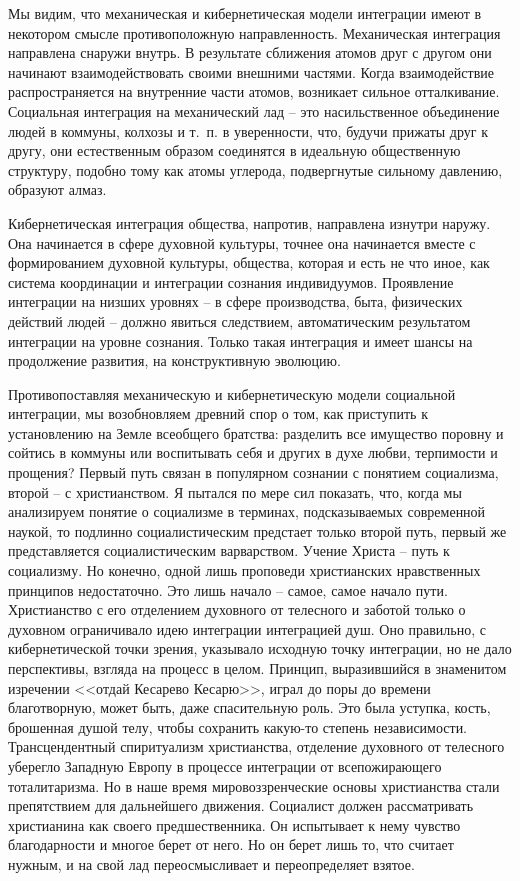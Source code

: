 \documentclass{book}
\begin{document}
Мы видим, что механическая и кибернетическая модели ин­теграции имеют в некотором смысле противоположную на­правленность. Механическая интеграция направлена снаружи внутрь. В результате сближения атомов друг с другом они на­чинают взаимодействовать своими внешними частями. Когда взаимодействие распространяется на внутренние части атомов, возникает сильное отталкивание. Социальная интеграция на механический лад -- это насильственное объединение людей в коммуны, колхозы и т.~п. в уверенности, что, будучи прижаты друг к другу, они естественным образом соединятся в идеаль­ную общественную структуру, подобно тому как атомы углерода, подвергнутые сильному давлению, образуют алмаз.

Кибернетическая интеграция общества, напротив, направ­лена изнутри наружу. Она начинается в сфере духовной куль­туры, точнее она начинается вместе с  формированием духов­ной культуры, общества, которая и есть не что иное, как си­стема координации и интеграции сознания индивидуумов. Про­явление интеграции на низших уровнях -- в сфере производст­ва, быта, физических действий людей -- должно явиться следст­вием, автоматическим результатом интеграции на уровне со­знания. Только такая интеграция и имеет шансы на продолже­ние развития, на конструктивную эволюцию.

Противопоставляя механическую и кибернетическую моде­ли социальной интеграции, мы возобновляем древний спор о том, как приступить к установлению на Земле всеобщего братст­ва: разделить все имущество поровну и сойтись в коммуны или воспитывать себя и других в духе любви, терпимости и про­щения? Первый путь связан в популярном сознании с понятием социализма, второй -- с христианством. Я пытался по мере сил показать, что, когда мы анализируем понятие о социализме в терминах, подсказываемых современной наукой, то подлинно социалистическим предстает только второй путь, первый же представляется социалистическим варварством. Учение Христа -- путь к социализму. Но конечно, одной лишь проповеди хри­стианских нравственных принципов недостаточно. Это лишь на­чало -- самое, самое начало пути. Христианство с его отделением духовного от телесного и заботой только о духовном ограничи­вало идею интеграции интеграцией душ. Оно правильно, с кибернетической точки зрения, указывало исходную точку интег­рации, но не дало 
перспективы, взгляда на процесс в целом. Принцип, выразившийся в знаменитом изречении <<отдай Кесарево Кесарю>>, играл до поры до времени благотворную, может быть, даже спасительную роль. Это была уступка, кость, брошен­ная душой телу, чтобы сохранить какую-то степень независимости. Трансцендентный спиритуализм христианства, отделе­ние духовного от телесного уберегло Западную Европу в про­цессе интеграции от всепожирающего тоталитаризма. Но в наше время мировоззренческие основы христианства стали препятствием для дальнейшего движения. Социалист должен рассматривать христианина как своего предшественника. Он испытывает к нему чувство благодарности и многое берет от него. Но он берет лишь то, что считает нужным, и на свой лад переосмысливает и переопределяет взятое.
\end{document}
